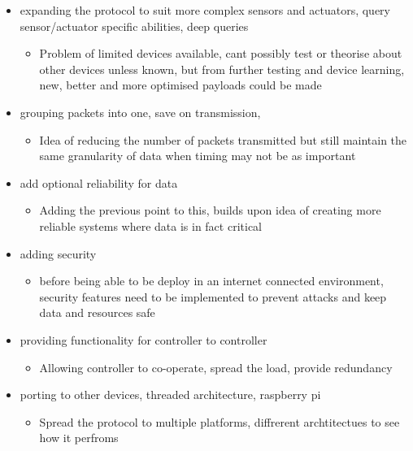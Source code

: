 \begin{itemize}
	\item expanding the protocol to suit more complex sensors and actuators, query sensor/actuator specific abilities, deep queries
	\begin{itemize}
		\item Problem of limited devices available, cant possibly test or theorise about other devices unless known, but from further testing and device learning, new, better and more optimised payloads could be made
	\end{itemize}
	\item grouping packets into one, save on transmission,
	\begin{itemize}
		\item Idea of reducing the number of packets transmitted but still maintain the same granularity of data when timing may not be as important
	\end{itemize}
	\item add optional reliability for data
	\begin{itemize}
		\item Adding the previous point to this, builds upon idea of creating more reliable systems where data is in fact critical
	\end{itemize}
	\item adding security
	\begin{itemize}
		\item before being able to be deploy in an internet connected environment, security features need to be implemented to prevent attacks and keep data and resources safe	
	\end{itemize}
	\item providing functionality for controller to controller
	\begin{itemize}
		\item Allowing controller to co-operate, spread the load, provide redundancy
	\end{itemize}
	\item porting to other devices, threaded architecture, raspberry pi
	\begin{itemize}
		\item Spread the protocol to multiple platforms, diffrerent archtitectues to see how it perfroms
	\end{itemize}
\end{itemize}

